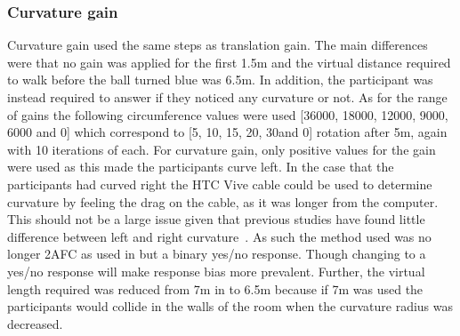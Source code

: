 \subsubsection{Curvature gain}
Curvature gain used the same steps as translation gain. The main differences were that no gain was applied for the first 1.5m and the virtual distance required to walk before the ball turned blue was 6.5m. In addition, the participant was instead required to answer if they noticed any curvature or not. As for the range of gains the following circumference values were used [36000, 18000, 12000, 9000, 6000 and 0] which correspond to [5\textdegree, 10\textdegree, 15\textdegree, 20\textdegree, 30\textdegree and 0\textdegree] rotation after 5m, again with 10 iterations of each. For curvature gain, only positive values for the gain were used as this made the participants curve left. In the case that the participants had curved right the HTC Vive cable could be used to determine curvature by feeling the drag on the cable, as it was longer from the computer. This should not be a large issue given that previous studies have found little difference between left and right curvature~\cite{bruder2012redirecting}. As such the method used was no longer 2AFC as used in \cite{steinicke2010estimation} but a binary yes/no response. Though changing to a yes/no response will make response bias more prevalent. Further, the virtual length required was reduced from 7m in \cite{steinicke2010estimation} to 6.5m because if 7m was used the participants would collide in the walls of the room when the curvature radius was decreased.